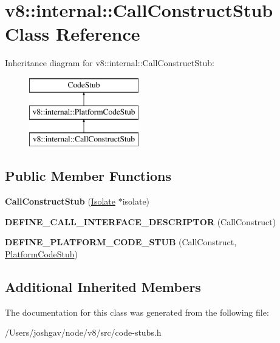 \hypertarget{classv8_1_1internal_1_1_call_construct_stub}{}\section{v8\+:\+:internal\+:\+:Call\+Construct\+Stub Class Reference}
\label{classv8_1_1internal_1_1_call_construct_stub}
Inheritance diagram for v8\+:\+:internal\+:\+:Call\+Construct\+Stub\+:\begin{figure}[H]
\begin{center}
\leavevmode
\includegraphics[height=3.000000cm]{classv8_1_1internal_1_1_call_construct_stub}
\end{center}
\end{figure}
\subsection*{Public Member Functions}
\begin{DoxyCompactItemize}
\item 
{\bfseries Call\+Construct\+Stub} (\hyperlink{classv8_1_1internal_1_1_isolate}{Isolate} $\ast$isolate)\hypertarget{classv8_1_1internal_1_1_call_construct_stub_a91d445a8ba53e27294ed151b1603e6d6}{}\label{classv8_1_1internal_1_1_call_construct_stub_a91d445a8ba53e27294ed151b1603e6d6}

\item 
{\bfseries D\+E\+F\+I\+N\+E\+\_\+\+C\+A\+L\+L\+\_\+\+I\+N\+T\+E\+R\+F\+A\+C\+E\+\_\+\+D\+E\+S\+C\+R\+I\+P\+T\+OR} (Call\+Construct)\hypertarget{classv8_1_1internal_1_1_call_construct_stub_ab4dec2c2f854363178a8204a578d3982}{}\label{classv8_1_1internal_1_1_call_construct_stub_ab4dec2c2f854363178a8204a578d3982}

\item 
{\bfseries D\+E\+F\+I\+N\+E\+\_\+\+P\+L\+A\+T\+F\+O\+R\+M\+\_\+\+C\+O\+D\+E\+\_\+\+S\+T\+UB} (Call\+Construct, \hyperlink{classv8_1_1internal_1_1_platform_code_stub}{Platform\+Code\+Stub})\hypertarget{classv8_1_1internal_1_1_call_construct_stub_a99c3459a09321662996a5b37da2d240a}{}\label{classv8_1_1internal_1_1_call_construct_stub_a99c3459a09321662996a5b37da2d240a}

\end{DoxyCompactItemize}
\subsection*{Additional Inherited Members}


The documentation for this class was generated from the following file\+:\begin{DoxyCompactItemize}
\item 
/\+Users/joshgav/node/v8/src/code-\/stubs.\+h\end{DoxyCompactItemize}
